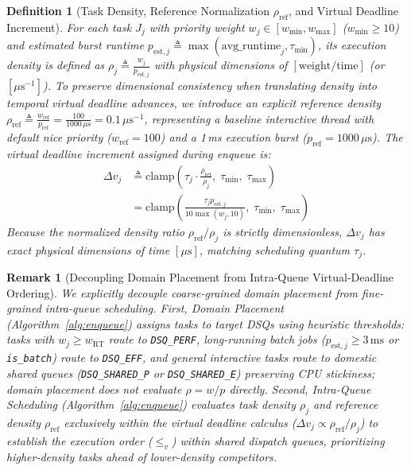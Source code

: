 \documentclass[letterpaper,twocolumn,10pt]{article}
\newtheorem{definition}{Definition}
\newtheorem{remark}{Remark}
\begin{document}
\begin{definition}[Task Density, Reference Normalization $\rho_{\mathrm{ref}}$, and Virtual Deadline Increment]
\label{def:density_ref}
For each task $J_j$ with priority weight $w_j \in [w_{\min}, w_{\max}]$ ($w_{\min} \ge 10$) and estimated burst runtime $p_{\mathrm{est},j} \triangleq \max(\mathrm{avg\_runtime}_j, \tau_{\min})$, its execution density is defined as $\rho_j \triangleq \frac{w_j}{p_{\mathrm{est},j}}$ with physical dimensions of $[\mathrm{weight}/\mathrm{time}]$ (or $[\mu\mathrm{s}^{-1}]$). To preserve dimensional consistency when translating density into temporal virtual deadline advances, we introduce an explicit reference density $\rho_{\mathrm{ref}} \triangleq \frac{w_{\mathrm{ref}}}{p_{\mathrm{ref}}} = \frac{100}{1000\,\mu\mathrm{s}} = 0.1\,\mu\mathrm{s}^{-1}$, representing a baseline interactive thread with default nice priority ($w_{\mathrm{ref}} = 100$) and a 1\,ms execution burst ($p_{\mathrm{ref}} = 1000\,\mu\mathrm{s}$). The virtual deadline increment assigned during enqueue is:
\begin{align}
\label{eq:delta_v_formula}
\Delta v_j &\triangleq \mathrm{clamp}\left( \tau_j \cdot \frac{\rho_{\mathrm{ref}}}{\rho_j}, \; \tau_{\min}, \; \tau_{\max} \right) \nonumber \\
&= \mathrm{clamp}\left( \frac{\tau_j p_{\mathrm{est},j}}{10 \max(w_j, 10)}, \; \tau_{\min}, \; \tau_{\max} \right)
\end{align}
Because the normalized density ratio $\rho_{\mathrm{ref}} / \rho_j$ is strictly dimensionless, $\Delta v_j$ has exact physical dimensions of time $[\mu\mathrm{s}]$, matching scheduling quantum $\tau_j$.
\end{definition}

\begin{remark}[Decoupling Domain Placement from Intra-Queue Virtual-Deadline Ordering]
\label{rem:domain_vs_density}
We explicitly decouple coarse-grained domain placement from fine-grained intra-queue scheduling. First, \emph{Domain Placement (Algorithm~\ref{alg:enqueue})} assigns tasks to target DSQs using heuristic thresholds: tasks with $w_j \ge w_{\mathrm{RT}}$ route to \texttt{DSQ\_PERF}, long-running batch jobs ($p_{\mathrm{est},j} \ge 3\,\mathrm{ms}$ or \texttt{is\_batch}) route to \texttt{DSQ\_EFF}, and general interactive tasks route to domestic shared queues (\texttt{DSQ\_SHARED\_P} or \texttt{DSQ\_SHARED\_E}) preserving CPU stickiness; domain placement does not evaluate $\rho = w/p$ directly. Second, \emph{Intra-Queue Scheduling (Algorithm~\ref{alg:enqueue})} evaluates task density $\rho_j$ and reference density $\rho_{\mathrm{ref}}$ exclusively within the virtual deadline calculus ($\Delta v_j \propto \rho_{\mathrm{ref}}/\rho_j$) to establish the execution order ($\le_v$) within shared dispatch queues, prioritizing higher-density tasks ahead of lower-density competitors.
\end{remark}
\end{document}
